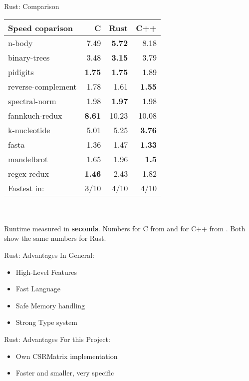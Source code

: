 \begin{frame}[c]{Rust: Comparison}
    \normalsize
    \vfill
    \begin{tabular}{lrrr}
        \textbf{Speed coparison} & C & Rust & C++ \\ \hline
        n-body & 7.49 & \textbf{5.72} & 8.18 \\
        binary-trees & 3.48 & \textbf{3.15} & 3.79 \\
        pidigits & \textbf{1.75} & \textbf{1.75} & 1.89 \\
        reverse-complement & 1.78 & 1.61 & \textbf{1.55} \\
        spectral-norm & 1.98 & \textbf{1.97} & 1.98 \\
        fannkuch-redux & \textbf{8.61} & 10.23 & 10.08 \\
        k-nucleotide & 5.01 & 5.25 & \textbf{3.76} \\
        fasta & 1.36 & 1.47 & \textbf{1.33} \\
        mandelbrot & 1.65 & 1.96 & \textbf{1.5} \\
        regex-redux & \textbf{1.46} & 2.43 & 1.82 \\ \hline
        Fastest in: & 3/10 & 4/10 & 4/10 \\
    \end{tabular} \\ \\
    \footnotesize
    Runtime measured in \textbf{seconds}. Numbers for C from \cite{benchc} and for C++ from
    \cite{benchcpp}. Both show the same numbers for Rust.

\end{frame}



\begin{frame}[c]{Rust: Advantages}
    \Large
    In General:
    \begin{itemize}[<+(1)->]
        \item High-Level Features
        \item Fast Language
        \item Safe Memory handling
        \item Strong Type system
    \end{itemize}
\end{frame}


\begin{frame}[c]{Rust: Advantages}
    \Large
    For this Project:
    \begin{itemize}[<+(1)->]
        \item Own CSRMatrix implementation
        \item Faster and smaller, very specific
    \end{itemize}
\end{frame}



